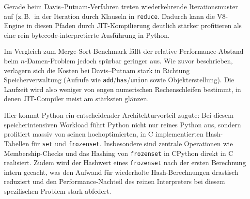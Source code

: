 Gerade beim Davis--Putnam-Verfahren treten wiederkehrende Iterationsmuster auf (z.\,B.\ in der Iteration durch Klauseln in \texttt{reduce}. Dadurch kann die V8-Engine in diesen Pfaden durch JIT-Kompilierung deutlich stärker profitieren als eine rein bytecode-interpretierte Ausführung in Python.

Im Vergleich zum Merge-Sort-Benchmark fällt der relative Performance-Abstand beim \(n\)-Damen-Problem jedoch spürbar geringer aus. Wie zuvor beschrieben, verlagern sich die Kosten bei Davis--Putnam stark in Richtung Speicherverwaltung (Aufrufe wie \texttt{add}/\texttt{has}/\texttt{union} sowie Objekterstellung). Die Laufzeit wird also weniger von engen numerischen Rechenschleifen bestimmt, in denen JIT-Compiler meist am stärksten glänzen.

Hier kommt Python ein entscheidender Architekturvorteil zugute: Bei diesem speicherintensiven Workload führt Python nicht nur reines Python aus, sondern profitiert massiv von seinen hochoptimierten, in C implementierten Hash-Tabellen für \texttt{set} und \texttt{frozenset}. Insbesondere sind zentrale Operationen wie Membership-Checks und das Hashing von \texttt{frozenset} in CPython direkt in C realisiert. Zudem wird der Hashwert eines \texttt{frozenset} nach der ersten Berechnung intern gecacht, was den Aufwand für wiederholte Hash-Berechnungen drastisch reduziert und den Performance-Nachteil des reinen Interpreters bei diesem spezifischen Problem stark abfedert.


